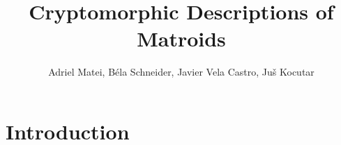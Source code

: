 \documentclass{article}
\title{Cryptomorphic Descriptions of Matroids}
\author{Adriel Matei, Béla Schneider, Javier Vela Castro, Juš Kocutar}
\theoremstyle{plain}
\theoremstyle{definition}
\theoremstyle{remark}
\numberwithin{equation}{section}
\begin{document}
\maketitle

\tableofcontents

\section{Introduction}



















\nocite{*} 


\end{document}
